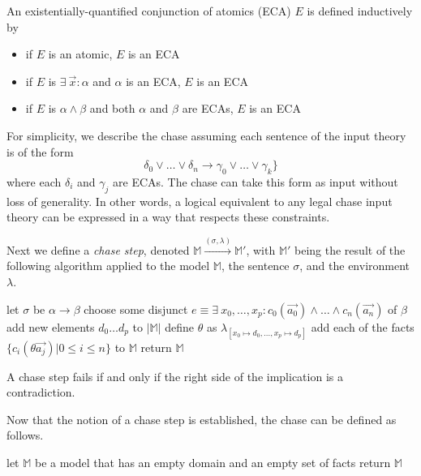 		An existentially-quantified conjunction of atomics (ECA) $E$ is defined
		inductively by
		\begin{itemize}
		\item if $E$ is an atomic, $E$ is an ECA
		\item if $E$ is $\exists\ \vec{x} : \alpha$ and $\alpha$ is an ECA, $E$ is an ECA
		\item if $E$ is $\alpha \wedge \beta$ and both $\alpha$ and $\beta$ are ECAs, $E$ is an ECA
		\end{itemize}
		For simplicity, we describe the chase assuming each sentence of the
		input theory is of the form
		\[\delta_0 \vee\ldots\vee \delta_n \to \gamma_0 \vee\ldots\vee \gamma_k\}\]
		where each $\delta_i$ and $\gamma_j$ are ECAs.  The chase can take this
		form as input without loss of generality. In other words, a logical
		equivalent to any legal chase input theory can be expressed in a way
		that respects these constraints.

		Next we define a \emph{chase step}, denoted $\mathbb{M}
		\xrightarrow{(\sigma,\lambda)} \mathbb{M}'$, with $\mathbb{M'}$ being
		the result of the following algorithm applied to the model
		$\mathbb{M}$, the sentence $\sigma$, and the environment $\lambda$.

		\begin{algorithm}[H]
		\DontPrintSemicolon
		let $\sigma$ be $\alpha \to \beta$ \;
		choose some disjunct $e \equiv \exists\ x_0,\ldots,x_p : c_0(\vec{a_0}) \wedge\ldots\wedge c_n(\vec{a_n})$ of $\beta$ \;
		add new elements $d_0 \ldots d_p$ to $|\mathbb{M}|$ \;
		define $\theta$ as $\lambda_{[x_0 \mapsto d_0 , \ldots , x_p \mapsto d_p]}$ \;
		add each of the facts $\{c_i(\theta\vec{a_j}) | 0 \le i \le n \}$ to $\mathbb{M}$ \;
		return $\mathbb{M}$ \;
		\end{algorithm}

		A chase step fails if and only if the right side of the
		implication is a contradiction.

		Now that the notion of a chase step is established, the chase can be
		defined as follows.

		\begin{algorithm}[H]
		\DontPrintSemicolon
		let $\mathbb{M}$ be a model that has an empty domain and an empty set of facts \;
		return $\mathbb{M}$
		\end{algorithm}

